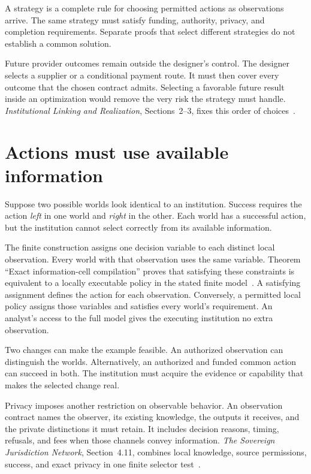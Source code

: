 \documentclass{momentum}
\begin{document}
A strategy is a complete rule for choosing permitted actions as observations arrive.
The same strategy must satisfy funding, authority, privacy, and completion requirements.
Separate proofs that select different strategies do not establish a common solution.

Future provider outcomes remain outside the designer's control.
The designer selects a supplier or a conditional payment route.
It must then cover every outcome that the chosen contract admits.
Selecting a favorable future result inside an optimization would remove the very risk the strategy must handle.
\emph{Institutional Linking and Realization}, Sections~2--3, fixes this order of choices~\cite{linking}.

\section{Actions must use available information}
\label{sec:observations}

Suppose two possible worlds look identical to an institution.
Success requires the action \emph{left} in one world and \emph{right} in the other.
Each world has a successful action, but the institution cannot select correctly from its available information.

The finite construction assigns one decision variable to each distinct local observation.
Every world with that observation uses the same variable.
Theorem ``Exact information-cell compilation'' proves that satisfying these constraints is equivalent to a locally executable policy in the stated finite model~\cite[Section~3]{linking}.
A satisfying assignment defines the action for each observation.
Conversely, a permitted local policy assigns those variables and satisfies every world's requirement.
An analyst's access to the full model gives the executing institution no extra observation.

Two changes can make the example feasible.
An authorized observation can distinguish the worlds.
Alternatively, an authorized and funded common action can succeed in both.
The institution must acquire the evidence or capability that makes the selected change real.

Privacy imposes another restriction on observable behavior.
An observation contract names the observer, its existing knowledge, the outputs it receives, and the private distinctions it must retain.
It includes decision reasons, timing, refusals, and fees when those channels convey information.
\emph{The Sovereign Jurisdiction Network}, Section~4.11, combines local knowledge, source permissions, success, and exact privacy in one finite selector test~\cite{recognition}.
\end{document}
